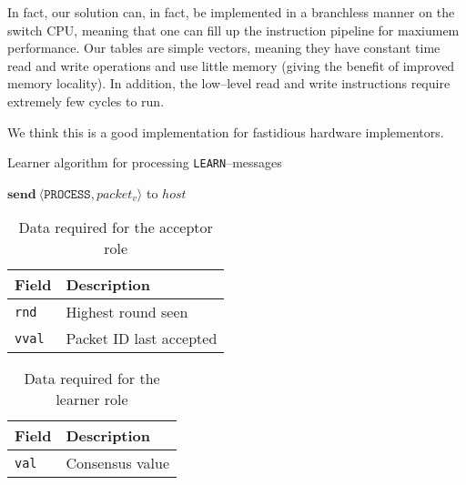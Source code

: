 In fact, our solution can, in fact, be implemented in a branchless manner on the
switch CPU, meaning that one can fill up the instruction pipeline for
maxiumem performance.  Our tables are simple vectors, meaning they
have constant time read and write operations and use little memory
(giving the benefit of improved memory locality).  In addition, the
low--level read and write instructions require extremely few cycles to run.

We think this is a good implementation for fastidious hardware implementors.

\begin{algorithm}[H]
  \caption{Learner algorithm for processing \texttt{LEARN}--messages}
  \label{paxos.algorithm.learner}
  \begin{algorithmic}
        \State $\textbf{send}~\langle \texttt{PROCESS}, packet_{v} \rangle$ to $host$
      \EndFor
    \EndOn
  \end{algorithmic}
\end{algorithm}

\begin{table}[H]
\begin{tabular}{|l|l|}
\hline \textbf{Field} & \textbf{Description} \\
\hline \texttt{rnd} & Highest round seen \\
\hline \texttt{vval} & Packet ID last accepted \\
\hline
\end{tabular}
\caption{Data required for the acceptor role}
\label{paxos.acceptor.fields}
\end{table}

\begin{table}[H]
\begin{tabular}{|l|l|}
\hline \textbf{Field} & \textbf{Description} \\
\hline \texttt{val} & Consensus value \\
\hline
\end{tabular}
\caption{Data required for the learner role}
\label{paxos.learner.fields}
\end{table}

